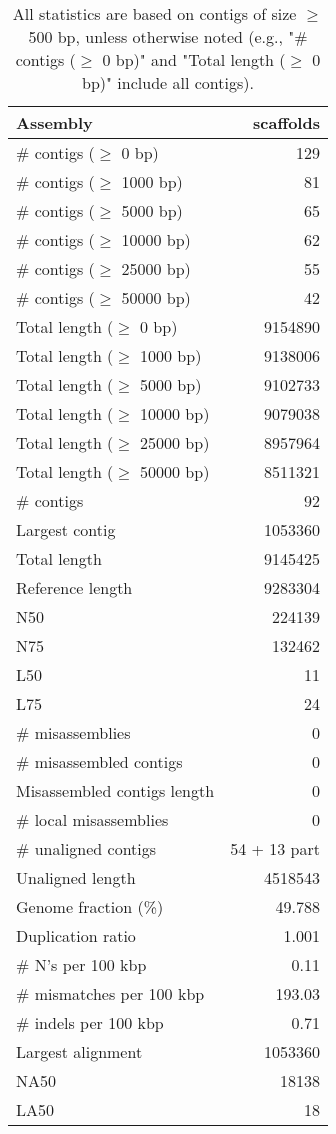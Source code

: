 \documentclass[12pt,a4paper]{article}
\begin{document}
\begin{table}[ht]
\begin{center}
\caption{All statistics are based on contigs of size $\geq$ 500 bp, unless otherwise noted (e.g., "\# contigs ($\geq$ 0 bp)" and "Total length ($\geq$ 0 bp)" include all contigs).}
\begin{tabular}{|l*{1}{|r}|}
\hline
Assembly & scaffolds \\ \hline
\# contigs ($\geq$ 0 bp) & 129 \\ \hline
\# contigs ($\geq$ 1000 bp) & 81 \\ \hline
\# contigs ($\geq$ 5000 bp) & 65 \\ \hline
\# contigs ($\geq$ 10000 bp) & 62 \\ \hline
\# contigs ($\geq$ 25000 bp) & 55 \\ \hline
\# contigs ($\geq$ 50000 bp) & 42 \\ \hline
Total length ($\geq$ 0 bp) & 9154890 \\ \hline
Total length ($\geq$ 1000 bp) & 9138006 \\ \hline
Total length ($\geq$ 5000 bp) & 9102733 \\ \hline
Total length ($\geq$ 10000 bp) & 9079038 \\ \hline
Total length ($\geq$ 25000 bp) & 8957964 \\ \hline
Total length ($\geq$ 50000 bp) & 8511321 \\ \hline
\# contigs & 92 \\ \hline
Largest contig & 1053360 \\ \hline
Total length & 9145425 \\ \hline
Reference length & 9283304 \\ \hline
N50 & 224139 \\ \hline
N75 & 132462 \\ \hline
L50 & 11 \\ \hline
L75 & 24 \\ \hline
\# misassemblies & 0 \\ \hline
\# misassembled contigs & 0 \\ \hline
Misassembled contigs length & 0 \\ \hline
\# local misassemblies & 0 \\ \hline
\# unaligned contigs & 54 + 13 part \\ \hline
Unaligned length & 4518543 \\ \hline
Genome fraction (\%) & 49.788 \\ \hline
Duplication ratio & 1.001 \\ \hline
\# N's per 100 kbp & 0.11 \\ \hline
\# mismatches per 100 kbp & 193.03 \\ \hline
\# indels per 100 kbp & 0.71 \\ \hline
Largest alignment & 1053360 \\ \hline
NA50 & 18138 \\ \hline
LA50 & 18 \\ \hline
\end{tabular}
\end{center}
\end{table}
\end{document}
